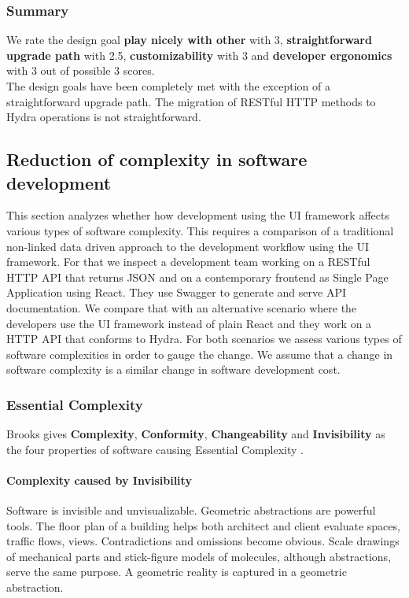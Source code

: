 \subsubsection{Summary}
We rate the design goal \textbf{play nicely with other} with 3, \textbf{straightforward upgrade path} with 2.5, \textbf{customizability} with 3 and \textbf{developer ergonomics} with 3 out of possible 3 scores. \\ The design goals have been completely met with the exception of a straightforward upgrade path. The migration of RESTful HTTP methods to Hydra operations is not straightforward.

\subsection{Reduction of complexity in software development}
This section analyzes whether how development using the UI framework affects various types of software complexity. This requires a comparison of a traditional non-linked data driven approach to the development workflow using the UI framework. For that we inspect a development team working on a RESTful HTTP API that returns JSON and on a contemporary frontend as Single Page Application using React. They use Swagger to generate and serve API documentation. We compare that with an alternative scenario where the developers use the UI framework instead of plain React and they work on a HTTP API that conforms to Hydra. For both scenarios we assess various types of software complexities in order to gauge the change. We assume that a change in software complexity is a similar change in software development cost.

\subsubsection{Essential Complexity}
Brooks gives \textbf{Complexity}, \textbf{Conformity}, \textbf{Changeability} and \textbf{Invisibility} as the four properties of software causing Essential Complexity \citep{nosilverbullet}.

\paragraph{Complexity caused by Invisibility}
Software is invisible and unvisualizable. Geometric abstractions are powerful tools. The floor plan of a building helps both architect and client evaluate spaces, traffic flows, views. Contradictions and omissions become obvious. Scale drawings of mechanical parts and stick-figure models of molecules, although abstractions, serve the same purpose. A geometric reality is captured in a geometric abstraction.

